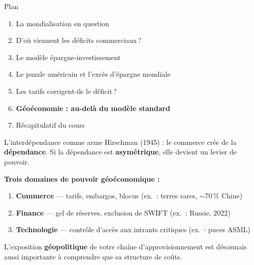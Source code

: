 \documentclass[aspectratio=169]{beamer}
\begin{document}

\begin{frame}{Plan}
   \begin{enumerate}
      \setlength\itemsep{0.4cm}
      \item {\color{gray!50}La mondialisation en question}
      \item {\color{gray!50}D'où viennent les déficits commerciaux\,?}
      \item {\color{gray!50}Le modèle épargne-investissement}
      \item {\color{gray!50}Le puzzle américain et l'excès d'épargne mondiale}
      \item {\color{gray!50}Les tarifs corrigent-ils le déficit\,?}
      \item \textbf{Géoéconomie : au-delà du modèle standard}
      \item Récapitulatif du cours
   \end{enumerate}
\end{frame}


\begin{frame}[t]{L'interdépendance comme arme}
   \small
   \vspace{0.1cm}
   Hirschman (1945) : le commerce crée de la \textbf{dépendance}. Si la dépendance est \textbf{asymétrique}, elle devient un levier de pouvoir. \\
   \vspace{0.3cm}

   \textbf{Trois domaines de pouvoir géoéconomique :}
   \vspace{0.1cm}
   \begin{enumerate}
      \setlength\itemsep{0.12cm}
      \item \textbf{Commerce} --- tarifs, embargos, blocus \textcolor{HECgray}{\footnotesize (ex.\ : terres rares, $\sim$70\,\% Chine)}
      \item \textbf{Finance} --- gel de réserves, exclusion de SWIFT \textcolor{HECgray}{\footnotesize (ex.\ : Russie, 2022)}
      \item \textbf{Technologie} --- contrôle d'accès aux intrants critiques \textcolor{HECgray}{\footnotesize (ex.\ : puces ASML)}
   \end{enumerate}
   \vspace{0.25cm}
   \begin{bizimplication}
      \footnotesize
      L'exposition \textbf{géopolitique} de votre chaîne d'approvisionnement est désormais aussi importante à comprendre que sa structure de coûts.
   \end{bizimplication}
\end{frame}
\end{document}
